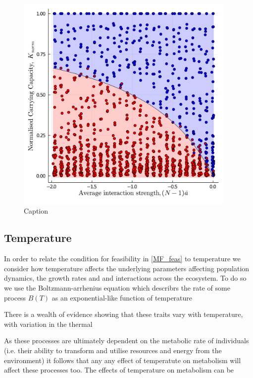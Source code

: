 \documentclass{article}
\begin{document}
\begin{figure}
    \centering
    \includegraphics[width = 0.95\textwidth]{docs/Figures/Fig_1.pdf}
    \caption{Caption}
    \label{fig:Feasability_Bound}
\end{figure}

\subsection{Temperature}
In order to relate the condition for feasibility in \cref{MF_feas} to temperature we consider how temperature affects the underlying parameters affecting population dynamics, the growth rates and and  interactions across the ecosystem. To do so we use the Boltzmann-arrhenius equation which describrs the rate of some process $B(T)$ as an exponential-like function of temperature 

There is a wealth of evidence showing that these traits vary with temperature, with variation in the thermal 

As these processes are ultimately dependent on the metabolic rate of individuals (i.e. their ability to transform and utilise resources and energy from the environment) it follows that any any effect of temperatute on metabolism will affect these processes too. The effects of temperature on metabolism can be 
\end{document}
